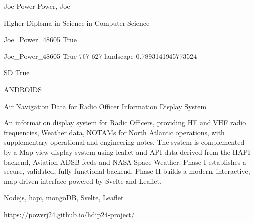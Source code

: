 
\begingroup{}\relax



\def\Key{Joe_Power_48605}

{Joe Power}
{Power, Joe}

{Higher Diploma in Science in Computer Science}

{Joe_Power_48605}
{True}

{Joe_Power_48605}
{True}
{707}
{627}
{landscape}
{0.7893141945773524}

{SD}
{True}

{ANDROIDS}

{Air Navigation Data for Radio Officer Information Display System}

{An information display system for Radio Officers, providing HF and VHF radio frequencies, Weather data, NOTAMs for North Atlantic operations, with supplementary operational and engineering notes. The system is complemented by a Map view display system using leaflet and API data derived from the HAPI backend, Aviation ADSB feeds and NASA Space Weather. Phase I establishes a secure, validated, fully functional backend. Phase II builds a modern, interactive, map‑driven interface powered by Svelte and Leaflet.}

{Nodejs, hapi, mongoDB, Svelte, Leaflet}

{https://powerj24.github.io/hdip24-project/}


